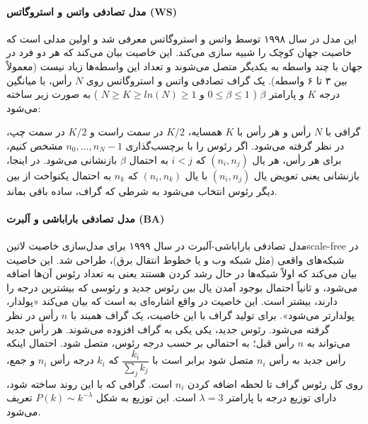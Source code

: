 \paragraph{مدل تصادفی واتس و استروگاتس (WS)}
این مدل در سال ۱۹۹۸ توسط واتس و استروگاتس معرفی شد و اولین مدلی است که خاصیت جهان کوچک را شبیه سازی می‌کند. این خاصیت بیان می‌کند که هر دو فرد در جهان با چند واسطه به یکدیگر متصل می‌شوند و تعداد این واسطه‌ها زیاد نیست (معمولاً بین ۳ تا ۶ واسطه). یک گراف تصادفی واتس و استروگاتس روی $N$ رأس، با میانگین درجه $K$ و پارامتر $\beta$ (
$0\leq \beta \leq 1$ و $N \geq K \geq ln(N) \geq 1$
) به صورت زیر ساخته می‌شود:
\begin{enumerate}
 گرافی با $N$ رأس و هر رأس با $K$ همسایه، $K/2$ در سمت راست و $K/2$ در سمت چپ، در نظر گرفته می‌شود.
 اگر رئوس را با برچسب‌گذاری $n_0,\ldots,n_N-1$ مشخص کنیم، برای هر رأس، هر یال $(n_i,n_j)$ که $i < j$ به احتمال $\beta$ بازنشانی می‌شود. در اینجا، بازنشانی یعنی تعویض یال $(n_i,n_j)$ با یال $(n_i,n_k)$ که $n_k$ به احتمال یکنواخت از بین دیگر رئوس انتخاب می‌شود به شرطی که گراف، ساده باقی بماند.
\end{enumerate}

\paragraph{مدل تصادفی باراباشی و آلبرت (BA)}
مدل تصادفی باراباشی-آلبرت در سال ۱۹۹۹ برای مدل‌سازی خاصیت ‌لاتین{scale-free} در شبکه‌های واقعی (مثل شبکه وب و یا خطوط انتقال برق)، طراحی شد. این خاصیت بیان می‌کند که اولاً شبکه‌ها در حال رشد کردن هستند یعنی به تعداد رئوس آن‌ها اضافه می‌شود، و ثانیاً احتمال بوجود آمدن یال بین رئوس جدید و رئوسی که بیشترین درجه را دارند، بیشتر است. این خاصیت در واقع اشاره‌ای به  است که بیان می‌کند «پولدار، پولدارتر می‌شود». برای تولید گراف با این خاصیت، یک گراف همبند با $n$ رأس در نظر گرفته می‌شود. رئوس جدید، یکی یکی به گراف افزوده می‌شوند. هر رأس جدید می‌تواند به $n$ رأس قبل؛ به احتمالی بر حسب درجه رئوس، متصل شود. احتمال اینکه رأس جدید به رأس $n_i$ متصل شود برابر است با
$\dfrac{k_i}{\sum_jk_j}$ 
که $k_i$ درجه رأس $n_i$ و جمع، روی کل رئوس گراف تا لحظه اضافه کردن $n_i$ است. گرافی که با این روند ساخته شود، دارای توزیع درجه  با پارامتر $\lambda = 3$ است. این توزیع به شکل $P(k) \sim k^{-\lambda}$ تعریف می‌شود.

